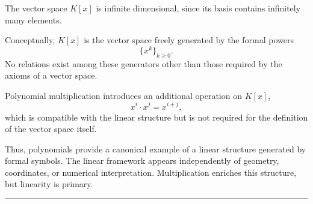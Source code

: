 The vector space $K[x]$ is infinite dimensional, since its basis contains infinitely many elements.

\medskip

Conceptually, $K[x]$ is the vector space freely generated by the formal powers
\[
\{ x^k \}_{k \ge 0}.
\]
No relations exist among these generators other than those required by the axioms of a vector space.

\medskip

Polynomial multiplication introduces an additional operation on $K[x]$,
\[
x^i \cdot x^j = x^{i+j},
\]
which is compatible with the linear structure but is not required for the definition of the vector space itself.

\medskip

Thus, polynomials provide a canonical example of a linear structure generated by formal symbols. The linear framework appears independently of geometry, coordinates, or numerical interpretation.
Multiplication enriches this structure, but linearity is primary.

\medskip
\hrule
\bigskip